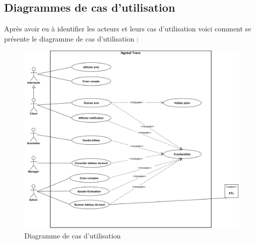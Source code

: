    \subsection[Diagrammes de cas d’utilisation]{Diagrammes de cas d’utilisation}
    Après avoir eu à identifier les acteurs et leurs cas d’utilisation
    voici comment se présente le diagramme de cas d’utilisation :
        \begin{figure}[H]
            \centering
            \includegraphics[width=150mm]{images/dcu_systeme.png}
            \caption{Diagramme de cas d’utilisation}
            \label{fig:dcu}
        \end{figure}
\pagebreak